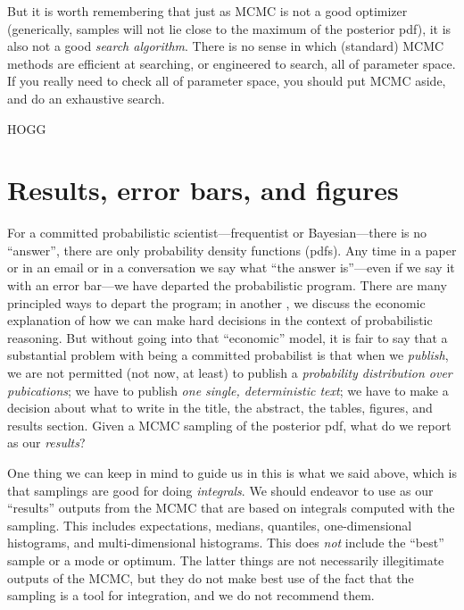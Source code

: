 \documentclass[12pt,twoside,pdftex]{article}
\begin{document}
But it is worth remembering that just as MCMC is not a good optimizer
(generically, samples will not lie close to the maximum of the posterior pdf),
it is also not a good \emph{search algorithm}.
There is no sense in which (standard) MCMC methods are efficient at
searching, or engineered to search, all of parameter space.
If you really need to check all of parameter space, you should put
MCMC aside, and do an exhaustive search.

\begin{problem}
HOGG
\end{problem}

\section{Results, error bars, and figures}\label{sec:results}

For a committed probabilistic scientist---frequentist or
Bayesian---there is no ``answer'', there are only probability density
functions (pdfs).  Any time in a paper or in an email or in a conversation
we say what ``the answer is''---even if we say it with an error
bar---we have departed the probabilistic program.  There are many
principled ways to depart the program; in another \documentname, we
discuss the economic explanation of how we can make hard decisions in
the context of probabilistic reasoning.
But without going into that ``economic'' model, it is fair to say that a
substantial problem with being a committed probabilist is that when we
\emph{publish}, we are not permitted (not now, at least) to publish a
\emph{probability distribution over pubications}; we have to publish
\emph{one single, deterministic text}; we have to make a decision about what
to write in the title, the abstract, the tables, figures, and results
section.  Given a MCMC sampling of the posterior pdf, what do we
report as our \emph{results}?

One thing we can keep in mind to guide us in this is what we said above,
  which is that samplings are good for doing \emph{integrals}.
We should endeavor to use as our ``results'' outputs from the MCMC
  that are based on integrals computed with the sampling.
This includes expectations, medians, quantiles, one-dimensional histograms,
  and multi-dimensional histograms.
This does \emph{not} include the ``best'' sample or a mode or optimum.
The latter things are not necessarily illegitimate outputs of the MCMC,
  but they do not make best use of the fact that the sampling is a tool for integration,
  and we do not recommend them.
\end{document}
